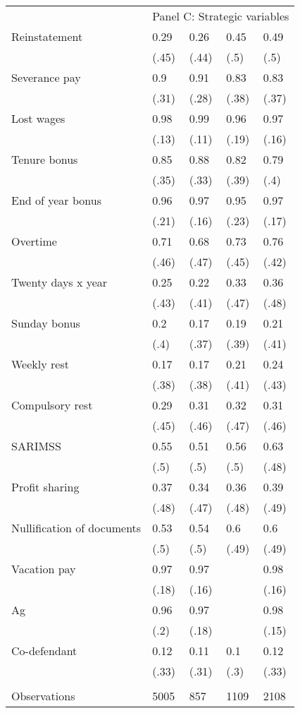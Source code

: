 \begin{tabular}{lllll}
\cmidrule{2-5}      & \multicolumn{4}{c}{Panel C: Strategic  variables} \\
\cmidrule{2-5}Reinstatement & 0.29  & 0.26  & 0.45  & 0.49 \\
      & (.45) & (.44) & (.5)  & (.5) \\
Severance pay & 0.9   & 0.91  & 0.83  & 0.83 \\
      & (.31) & (.28) & (.38) & (.37) \\
Lost wages & 0.98  & 0.99  & 0.96  & 0.97 \\
      & (.13) & (.11) & (.19) & (.16) \\
Tenure bonus & 0.85  & 0.88  & 0.82  & 0.79 \\
      & (.35) & (.33) & (.39) & (.4) \\
End of year bonus & 0.96  & 0.97  & 0.95  & 0.97 \\
      & (.21) & (.16) & (.23) & (.17) \\
Overtime & 0.71  & 0.68  & 0.73  & 0.76 \\
      & (.46) & (.47) & (.45) & (.42) \\
Twenty days x year & 0.25  & 0.22  & 0.33  & 0.36 \\
      & (.43) & (.41) & (.47) & (.48) \\
Sunday bonus & 0.2   & 0.17  & 0.19  & 0.21 \\
      & (.4)  & (.37) & (.39) & (.41) \\
Weekly rest & 0.17  & 0.17  & 0.21  & 0.24 \\
      & (.38) & (.38) & (.41) & (.43) \\
Compulsory rest & 0.29  & 0.31  & 0.32  & 0.31 \\
      & (.45) & (.46) & (.47) & (.46) \\
SARIMSS & 0.55  & 0.51  & 0.56  & 0.63 \\
      & (.5)  & (.5)  & (.5)  & (.48) \\
Profit sharing & 0.37  & 0.34  & 0.36  & 0.39 \\
      & (.48) & (.47) & (.48) & (.49) \\
Nullification of documents & 0.53  & 0.54  & 0.6   & 0.6 \\
      & (.5)  & (.5)  & (.49) & (.49) \\
Vacation pay & 0.97  & 0.97  &       & 0.98 \\
      & (.18) & (.16) &       & (.16) \\
Ag    & 0.96  & 0.97  &       & 0.98 \\
      & (.2)  & (.18) &       & (.15) \\
Co-defendant & 0.12  & 0.11  & 0.1   & 0.12 \\
      & (.33) & (.31) & (.3)  & (.33) \\
\midrule
\midrule
      &       &       &       &  \\
Observations & 5005  & 857   & 1109  & 2108 \\
\bottomrule
\end{tabular}%
